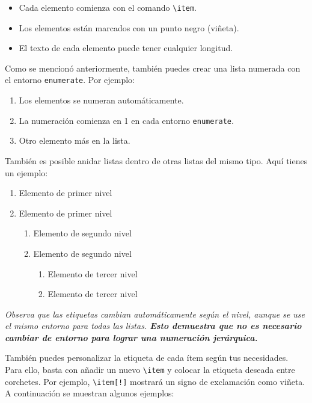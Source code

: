 \begin{itemize}
  \item Cada elemento comienza con el comando \verb|\item|.
  \item Los elementos están marcados con un punto negro (viñeta).
  \item El texto de cada elemento puede tener cualquier longitud.
\end{itemize}

Como se mencionó anteriormente, también puedes crear una lista numerada con el entorno \verb|enumerate|. Por ejemplo:

\begin{enumerate}
  \item Los elementos se numeran automáticamente.
  \item La numeración comienza en 1 en cada entorno \verb|enumerate|.
  \item Otro elemento más en la lista.
\end{enumerate}

También es posible anidar listas dentro de otras listas del mismo tipo. Aquí tienes un ejemplo:

\begin{enumerate}
    \item Elemento de primer nivel
    \item Elemento de primer nivel
    \begin{enumerate}
        \item Elemento de segundo nivel
        \item Elemento de segundo nivel
        \begin{enumerate}
            \item Elemento de tercer nivel
            \item Elemento de tercer nivel
        \end{enumerate}
    \end{enumerate}
\end{enumerate}

\begin{block}[tip]
\textit{Observa que las etiquetas cambian automáticamente según el nivel, aunque se use el mismo entorno para todas las listas. \textbf{Esto demuestra que no es necesario cambiar de entorno para lograr una numeración jerárquica.}}
\end{block}

También puedes personalizar la etiqueta de cada ítem según tus necesidades. Para ello, basta con añadir un nuevo \verb|\item| y colocar la etiqueta deseada entre corchetes. Por ejemplo, \verb|\item[!]| mostrará un signo de exclamación como viñeta. A continuación se muestran algunos ejemplos:

